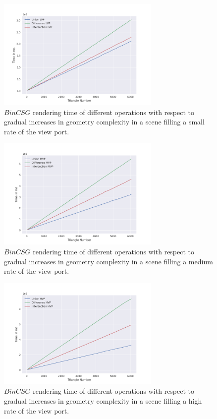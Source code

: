 \documentclass[a4paper,11pt,oneside]{article}
\begin{document}
\begin{figure}[H]
	\centering
	\includegraphics[width=0.7\textwidth]{section5/plots/bin_csg_lvp.png}
	\caption{$BinCSG$ rendering time of different operations with respect to gradual increases in geometry complexity in a scene filling a small rate of the view port.}
	\label{sec5.1:bin_operations_lvp}
\end{figure}

\begin{figure}[H]
	\centering
	\includegraphics[width=0.7\textwidth]{section5/plots/bin_csg_mvp.png}
	\caption{$BinCSG$ rendering time of different operations with respect to gradual increases in geometry complexity in a scene filling a medium rate of the view port.}
	\label{sec5.1:bin_operations_mvp}
\end{figure}

\begin{figure}[H]
	\centering
	\includegraphics[width=0.7\textwidth]{section5/plots/bin_csg_hvp.png}
	\caption{$BinCSG$ rendering time of different operations with respect to gradual increases in geometry complexity in a scene filling a high rate of the view port.}
	\label{sec5.1:bin_operations_hvp}
\end{figure}
\end{document}
